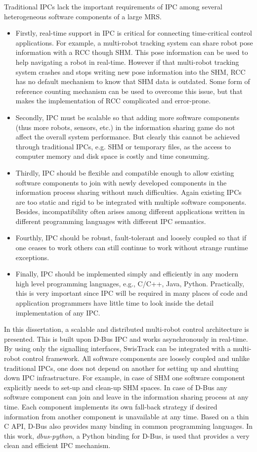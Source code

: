 Traditional IPCs lack the important requirements of IPC among several heterogeneous software components of a large MRS. 
\begin{itemize}
\item Firstly, real-time support in IPC is critical for connecting time-critical control applications. For example, a multi-robot tracking system  can share robot pose information with a \acf{RCC} though  \acf{SHM}. This pose information can be used to help navigating a robot in real-time. However if that multi-robot tracking system crashes and stops writing new pose information into the SHM, RCC has no default mechanism to know that SHM data is outdated. Some form of reference counting mechanism can be used to overcome this issue, but that makes the implementation of RCC complicated and error-prone.
%
\item Secondly, IPC must be scalable so that adding more software components (thus more robots, sensors, etc.) in the information sharing game do not affect the overall system performance. But clearly this cannot be achieved through traditional IPCs, e.g. SHM or temporary files, as the access to computer memory and disk space is costly and time consuming.
%
\item Thirdly, IPC should be flexible and compatible enough to allow existing software components to join with newly developed components in the information process sharing without much difficulties. Again existing IPCs are too static and rigid to be integrated with multiple software components. Besides, incompatibility often arises among different applications written in different programming languages with different IPC semantics.
%
\item Fourthly, IPC should be robust, fault-tolerant and loosely coupled so that if one ceases to work others can still continue to work without strange runtime exceptions. 
%
\item Finally, IPC should be implemented simply and efficiently in any modern high level programming languages, e.g., C/C++, Java, Python. Practically, this is very important since IPC will be required in many places of code and application programmers have little time to look inside the detail implementation of any IPC.
\end{itemize}
%
In this dissertation, a scalable and distributed multi-robot control architecture is presented. This is built upon D-Bus IPC and works asynchronously in real-time. By using only the signalling interfaces, SwisTrack can be integrated with a multi-robot control framework. All software components are loosely coupled and unlike traditional IPCs, one does not depend on another for setting up and shutting down IPC infrastructure. For example, in case of SHM one software component explicitly needs to set-up and clean-up SHM spaces. In case of D-Bus any software component can join and leave in the information sharing process at any time. Each component implements its own fall-back strategy if desired information from another component is unavailable at any time. Based on a thin C API, D-Bus also provides many binding in common programming languages. In this work,  {\em dbus-python}, a Python binding for D-Bus,  is used that provides a very clean and efficient IPC mechanism.
